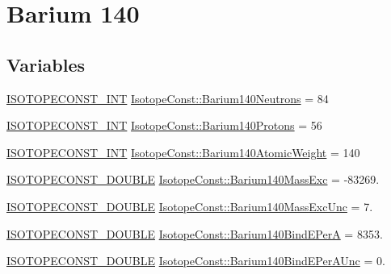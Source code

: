\hypertarget{group___isotope_const-_barium-_ba140}{}\section{Barium 140}
\label{group___isotope_const-_barium-_ba140}
\subsection*{Variables}
\begin{DoxyCompactItemize}
\item 
\mbox{\hyperlink{group___isotope_const-_macros_ga5f18360b3e99483a35c32d789e62621c}{I\+S\+O\+T\+O\+P\+E\+C\+O\+N\+S\+T\+\_\+\+I\+NT}} \mbox{\hyperlink{group___isotope_const-_barium-_ba140_gaff6950d3e20b4398fc3a76c70393abae}{Isotope\+Const\+::\+Barium140\+Neutrons}} = 84
\item 
\mbox{\hyperlink{group___isotope_const-_macros_ga5f18360b3e99483a35c32d789e62621c}{I\+S\+O\+T\+O\+P\+E\+C\+O\+N\+S\+T\+\_\+\+I\+NT}} \mbox{\hyperlink{group___isotope_const-_barium-_ba140_ga9577685f57cf574af2fbfea474131094}{Isotope\+Const\+::\+Barium140\+Protons}} = 56
\item 
\mbox{\hyperlink{group___isotope_const-_macros_ga5f18360b3e99483a35c32d789e62621c}{I\+S\+O\+T\+O\+P\+E\+C\+O\+N\+S\+T\+\_\+\+I\+NT}} \mbox{\hyperlink{group___isotope_const-_barium-_ba140_ga41f72e93ad7ea71e02a7f57e1aea6527}{Isotope\+Const\+::\+Barium140\+Atomic\+Weight}} = 140
\item 
\mbox{\hyperlink{group___isotope_const-_macros_ga8f45a7272ce02c0b4c65c44636ed719a}{I\+S\+O\+T\+O\+P\+E\+C\+O\+N\+S\+T\+\_\+\+D\+O\+U\+B\+LE}} \mbox{\hyperlink{group___isotope_const-_barium-_ba140_ga13c29dfcd7cbfeba0be4b3a56f6bd1db}{Isotope\+Const\+::\+Barium140\+Mass\+Exc}} = -\/83269.
\item 
\mbox{\hyperlink{group___isotope_const-_macros_ga8f45a7272ce02c0b4c65c44636ed719a}{I\+S\+O\+T\+O\+P\+E\+C\+O\+N\+S\+T\+\_\+\+D\+O\+U\+B\+LE}} \mbox{\hyperlink{group___isotope_const-_barium-_ba140_ga7bcf1e40da26e997d7a730214db56baf}{Isotope\+Const\+::\+Barium140\+Mass\+Exc\+Unc}} = 7.
\item 
\mbox{\hyperlink{group___isotope_const-_macros_ga8f45a7272ce02c0b4c65c44636ed719a}{I\+S\+O\+T\+O\+P\+E\+C\+O\+N\+S\+T\+\_\+\+D\+O\+U\+B\+LE}} \mbox{\hyperlink{group___isotope_const-_barium-_ba140_ga87c7218cb840bbf09a1922362d30faef}{Isotope\+Const\+::\+Barium140\+Bind\+E\+PerA}} = 8353.
\item 
\mbox{\hyperlink{group___isotope_const-_macros_ga8f45a7272ce02c0b4c65c44636ed719a}{I\+S\+O\+T\+O\+P\+E\+C\+O\+N\+S\+T\+\_\+\+D\+O\+U\+B\+LE}} \mbox{\hyperlink{group___isotope_const-_barium-_ba140_ga1d3cfb739b3483fb092df4acb607fa25}{Isotope\+Const\+::\+Barium140\+Bind\+E\+Per\+A\+Unc}} = 0.

\end{DoxyCompactItemize}
